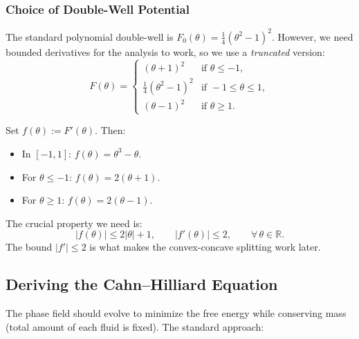 \documentclass[11pt,a4paper]{article}
\theoremstyle{definition}
\theoremstyle{remark}
\newcommand{\R}{\mathbb{R}}
\begin{document}
\subsubsection{Choice of Double-Well Potential}

The standard polynomial double-well is $F_0(\theta) = \frac{1}{4}(\theta^2 - 1)^2$.
However, we need bounded derivatives for the analysis to work, so we use
a \emph{truncated} version:
\begin{equation}
  \label{eq:truncated-F}
  F(\theta) =
  \begin{cases}
    (\theta + 1)^2   & \text{if } \theta \leq -1, \\
    \frac{1}{4}(\theta^2 - 1)^2 & \text{if } -1 \leq \theta \leq 1, \\
    (\theta - 1)^2   & \text{if } \theta \geq 1.
  \end{cases}
\end{equation}

Set $f(\theta) := F'(\theta)$. Then:
\begin{itemize}
  \item In $[-1,1]$: $f(\theta) = \theta^3 - \theta$.
  \item For $\theta \leq -1$: $f(\theta) = 2(\theta+1)$.
  \item For $\theta \geq 1$: $f(\theta) = 2(\theta-1)$.
\end{itemize}

The crucial property we need is:
\begin{equation}
  \label{eq:f-bounds}
  |f(\theta)| \leq 2|\theta| + 1, \qquad
  |f'(\theta)| \leq 2, \qquad \forall\, \theta \in \R.
\end{equation}
The bound $|f'| \leq 2$ is what makes the convex-concave splitting work
later.

\subsection{Deriving the Cahn--Hilliard Equation}

The phase field should evolve to minimize the free energy while
conserving mass (total amount of each fluid is fixed). The standard
approach:
\end{document}
